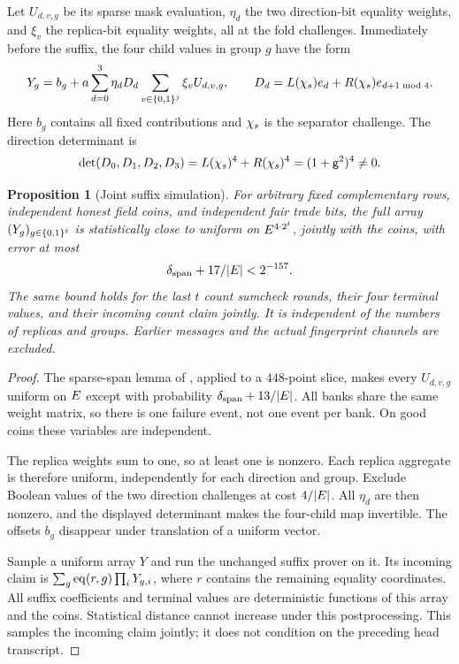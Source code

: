 \documentclass[11pt]{article}
\newtheorem{proposition}{Proposition}
\begin{document}
Let $U_{d,v,g}$ be its sparse mask evaluation, $\eta_d$ the two direction-bit equality weights, and $\xi_v$ the replica-bit equality weights, all at the fold challenges. Immediately before the suffix, the four child values in group $g$ have the form
\[
 Y_g=b_g+
 a\sum_{d=0}^3\eta_d D_d\sum_{v\in\{0,1\}^{j}}\xi_vU_{d,v,g},
 \qquad D_d=L(\chi_s)e_{d}+R(\chi_s)e_{d+1\bmod4}.
\]
Here $b_g$ contains all fixed contributions and $\chi_s$ is the separator challenge. The direction determinant is
\[
 \det(D_0,D_1,D_2,D_3)=L(\chi_s)^4+R(\chi_s)^4=(1+\mathsf{g}^2)^4\ne0.
\]

\begin{proposition}[Joint suffix simulation]
For arbitrary fixed complementary rows, independent honest field coins, and independent fair trade bits, the full array $(Y_g)_{g\in\{0,1\}^{t}}$ is statistically close to uniform on $E^{4\cdot2^t}$, jointly with the coins, with error at most
\[
 \delta_{\mathrm{span}}+17/|E|<2^{-157}.
\]
The same bound holds for the last $t$ count sumcheck rounds, their four terminal values, and their incoming count claim jointly. It is independent of the numbers of replicas and groups. Earlier messages and the actual fingerprint channels are excluded.
\end{proposition}
\begin{proof}
The sparse-span lemma of , applied to a $448$-point slice, makes every $U_{d,v,g}$ uniform on $E$ except with probability $\delta_{\mathrm{span}}+13/|E|$. All banks share the same weight matrix, so there is one failure event, not one event per bank. On good coins these variables are independent.

The replica weights sum to one, so at least one is nonzero. Each replica aggregate is therefore uniform, independently for each direction and group. Exclude Boolean values of the two direction challenges at cost $4/|E|$. All $\eta_d$ are then nonzero, and the displayed determinant makes the four-child map invertible. The offsets $b_g$ disappear under translation of a uniform vector.

Sample a uniform array $Y$ and run the unchanged suffix prover on it. Its incoming claim is $\sum_g\operatorname{eq}(r,g)\prod_iY_{g,i}$, where $r$ contains the remaining equality coordinates. All suffix coefficients and terminal values are deterministic functions of this array and the coins. Statistical distance cannot increase under this postprocessing. This samples the incoming claim jointly; it does not condition on the preceding head transcript.
\end{proof}
\end{document}
